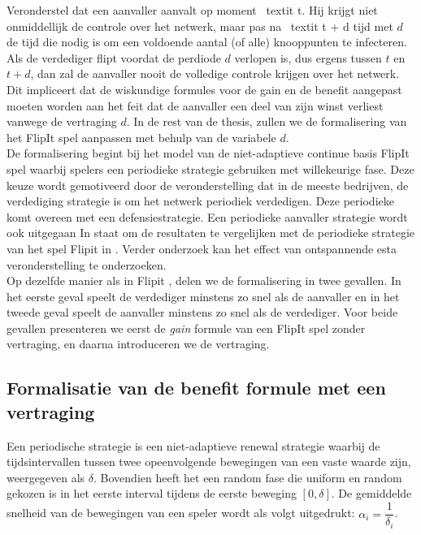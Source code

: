 \documentclass[master=cws, masteroption=vs,english]{kulemt}
\begin{document}
\begin{abstract*}
Veronderstel dat een aanvaller aanvalt op moment \ textit {t}. Hij krijgt niet onmiddellijk de controle over het netwerk, maar pas na \ textit {t + d} tijd met $ d $ de tijd die nodig is om een voldoende aantal (of alle) knooppunten te infecteren. Als de verdediger flipt voordat de perdiode $d$ verlopen is, dus ergens tussen $t$ en $t+d$, dan zal de aanvaller nooit de volledige controle krijgen over het netwerk. Dit impliceert dat de wiskundige formules voor de gain en de benefit aangepast moeten worden aan het feit dat de aanvaller een deel van zijn winst verliest vanwege de vertraging $d$. In de rest van de thesis, zullen we de formalisering van het FlipIt spel aanpassen met behulp van de variabele $ d $. \\

De formalisering begint bij het model van de niet-adaptieve continue basis FlipIt spel waarbij spelers een periodieke strategie gebruiken met willekeurige fase. Deze keuze wordt gemotiveerd door de veronderstelling dat in de meeste bedrijven, de verdediging strategie is om het netwerk periodiek verdedigen. Deze periodieke komt overeen met een defensiestrategie. Een periodieke aanvaller strategie wordt ook uitgegaan In staat om de resultaten te vergelijken met de periodieke strategie van het spel Flipit in \cite{Flipit}. %
Verder onderzoek kan het effect van ontspannende esta veronderstelling te onderzoeken. \\

Op dezelfde manier als in Flipit \citep{FlipIt}, delen we de formalisering in twee gevallen. In het eerste geval speelt de verdediger minstens zo snel als de aanvaller en in het tweede geval speelt de aanvaller minstens zo snel als de verdediger. Voor beide gevallen presenteren we eerst de \textit{gain} formule van een FlipIt spel zonder vertraging, en daarna introduceren we de vertraging. \\

\subsection{ Formalisatie van de benefit formule met een vertraging}
Een periodische strategie is een niet-adaptieve renewal strategie waarbij de tijdsintervallen tussen twee opeenvolgende bewegingen van een vaste waarde zijn, weergegeven als $\delta$. Bovendien heeft het een random fase die uniform en random gekozen is in het eerste interval tijdens de eerste beweging $[0,\delta]$. De gemiddelde snelheid van de bewegingen van een speler wordt als volgt uitgedrukt: $\alpha_{i} = \dfrac{1}{\delta_{i}}$. \\
~~\\


\end{abstract*}
\end{document}
